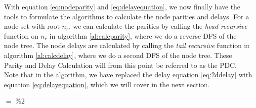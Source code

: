 With equation \ref{eq:nodeparity} and \ref{eq:delayequation}, we now finally have the tools to formulate the algorithms to calculate the node parities and delays. For a node set with root $n_r$, we can calculate the parities by calling the \emph{head recursive} function  on $n_r$ in algorithm \ref{al:calcparity}, where we do a reverse DFS of the node tree. The node delays are calculated by calling the \emph{tail recursive} function  in algorithm \ref{al:calcdelay}, where we do a second DFS of the node tree. These Parity and Delay Calculation will from this point be referred to as the PDC. Note that in the  algorithm, we have replaced the delay equation \ref{eq:2ddelay} with equation \ref{eq:delayequation}, which we will cover in the next section.

\begin{algo}[algotitle=CalcParity, label=al:calcparity]
\begin{algorithm}[H]

\KwData{\node}

\BlankLine

\parity $=$  $\%2$\;
\end{algorithm}
\end{algo}

\begin{algo}[algotitle=CalcDelay, label=al:calcdelay]
\begin{algorithm}[H]

\KwData{\node, \cluster}

\BlankLine

\end{algorithm}
\end{algo}

